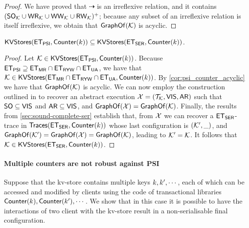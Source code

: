 \begin{proof}
We have proved that $\dashrightarrow$ is an irreflexive relation, and it contains $(\mathsf{SO}_{\mathcal{K}} \cup \mathsf{WR}_{\mathcal{K}} \cup \mathsf{WW}_{\mathcal{K}} \cup \mathsf{RW}_{\mathcal{K}})^+$; 
because any subset of an irreflexive relation is itself irreflexive, we obtain that $\mathsf{GraphOf}(\mathcal{K})$ is acyclic.
\end{proof}

\begin{corollary}
$\mathsf{KVStores}(\mathsf{ET}_{\mathsf{PSI}}, \mathsf{Counter}(k)) \subseteq \mathsf{KVStores}(\mathsf{ET}_{\mathsf{SER}}, \mathsf{Counter}(k))$. 
\end{corollary}

\begin{proof}
Let $\mathcal{K} \in \mathsf{KVStores}(\mathsf{ET}_{\mathsf{PSI}}, \mathsf{Counter}(k))$. Because $\mathsf{ET}_{\mathsf{PSI}} \supseteq \mathsf{ET}_{\mathsf{MR}} \cap \mathsf{ET}_{\mathsf{RYW}} \cap \mathsf{ET}_{\mathsf{UA}}$, 
we have that $\mathcal{K} \in \mathsf{KVStores}(\mathsf{ET}_{\mathsf{MR}} \cap \mathsf{ET}_{\mathsf{RYW}} \cap \mathsf{ET}_{\mathsf{UA}}, \mathsf{Counter}(k))$. 
By \cref{cor:psi_counter_acyclic} we have that $\mathsf{GraphOf}(\mathcal{K})$ is acyclic. We can now employ the construction 
outlined in \cite{laws} to recover an abstract execution $\mathcal{X} = (\mathcal{T}_{\mathcal{K}}, \mathsf{VIS}, \mathsf{AR})$ such that $\mathsf{SO} \subseteq \mathsf{VIS}$ and $\mathsf{AR} \subseteq \mathsf{VIS}$, 
and $\mathsf{GraphOf}(\mathcal{X}) = \mathsf{GraphOf}(\mathcal{K})$.
Finally, the results from \cref{sec:sound-complete-ser} establish that, from $\mathcal{X}$ we can recover a $\mathsf{ET}_{\mathsf{SER}}$-trace in 
$\mathsf{Traces}(\mathsf{ET}_{\mathsf{SER}}, \mathsf{Counter}(k))$ 
whose last configuration is $(\mathcal{K}', \_)$, and 
$\mathsf{GraphOf}(\mathcal{K}') = \mathsf{GraphOf}(\mathcal{X}) = \mathsf{GraphOf}(\mathcal{K})$, leading to $\mathcal{K}' = \mathcal{K}$. It follows that $\mathcal{K} \in 
\mathsf{KVStores}(\mathsf{ET}_{\mathsf{SER}}, \mathsf{Counter}(k))$.
\end{proof}

\paragraph{Multiple counters are not robust against PSI}
Suppose that the kv-store contains multiple keys $k, k', \cdots$, each of which 
can be accessed and modified by clients using the code of transactional libraries 
$\mathsf{Counter}(k), \mathsf{Counter}(k'), \cdots$. We show that in this
 case it is possible to have the interactions of two client with the kv-store result 
 in  a non-serialisable final configuration. 
 
